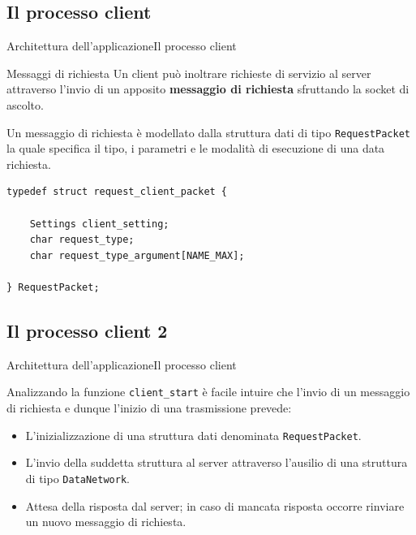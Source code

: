 \documentclass[10pt]{beamer}
\begin{document}
\subsection{Il processo client}
\begin{frame}[fragile]{Architettura dell'applicazione}{Il processo client}

\begin{block}{Messaggi di richiesta}
Un client può inoltrare richieste di servizio al server attraverso l'invio di un apposito \textbf{messaggio di richiesta} sfruttando la socket di ascolto. 
\end{block}

\vspace*{10px}
Un messaggio di richiesta è modellato dalla struttura dati di tipo \texttt{RequestPacket} la quale specifica il tipo, i parametri e le modalità di esecuzione di una data richiesta.

\begin{lstlisting}[frame=lines, caption={Implementazione della struttura \texttt{RequestPacket}}]
typedef struct request_client_packet {

	Settings client_setting;
	char request_type;
	char request_type_argument[NAME_MAX];

} RequestPacket;
\end{lstlisting}


\end{frame}

\subsection{Il processo client 2}
\begin{frame}[fragile]{Architettura dell'applicazione}{Il processo client}

Analizzando la funzione \texttt{client\_start} è facile intuire che l'invio di un messaggio di richiesta e dunque l'inizio di una trasmissione prevede:

\begin{itemize}
\item L'inizializzazione di una struttura dati denominata \texttt{RequestPacket}.
\item L'invio della suddetta struttura al server attraverso l'ausilio di una struttura di tipo \texttt{DataNetwork}.
\item Attesa della risposta dal server; in caso di mancata risposta occorre rinviare un nuovo messaggio di richiesta.
\end{itemize}



\end{frame}
\end{document}
